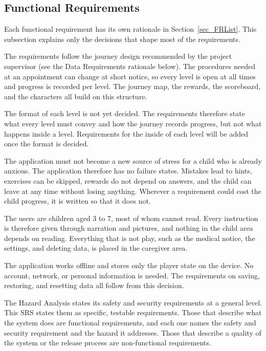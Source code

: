 \documentclass[12pt]{article}
\begin{document}
\subsection{Functional Requirements}

Each functional requirement has its own rationale in Section~\ref{sec_FRList}.
This subsection explains only the decisions that shape most of the
requirements.

The requirements follow the journey design recommended by the project
supervisor (see the Data Requirements rationale below). The procedures needed
at an appointment can change at short notice, so every level is open at all
times and progress is recorded per level. The journey map, the rewards, the
scoreboard, and the characters all build on this structure.

The format of each level is not yet decided. The requirements therefore state
what every level must convey and how the journey records progress, but not
what happens inside a level. Requirements for the inside of each level will be
added once the format is decided.

The application must not become a new source of stress for a child who is
already anxious. The application therefore has no failure states. Mistakes
lead to hints, exercises can be skipped, rewards do not depend on answers, and
the child can leave at any time without losing anything. Wherever a
requirement could cost the child progress, it is written so that it does not.

The users are children aged 3 to 7, most of whom cannot read. Every
instruction is therefore given through narration and pictures, and nothing in
the child area depends on reading. Everything that is not play, such as the
medical notice, the settings, and deleting data, is placed in the caregiver
area.

The application works offline and stores only the player state on the device.
No account, network, or personal information is needed. The requirements on
saving, restoring, and resetting data all follow from this decision.

The Hazard Analysis states its safety and security requirements at a general
level. This SRS states them as specific, testable requirements. Those that
describe what the system does are functional requirements, and each one names
the safety and security requirement and the hazard it addresses. Those that
describe a quality of the system or the release process are non-functional
requirements.
\end{document}

